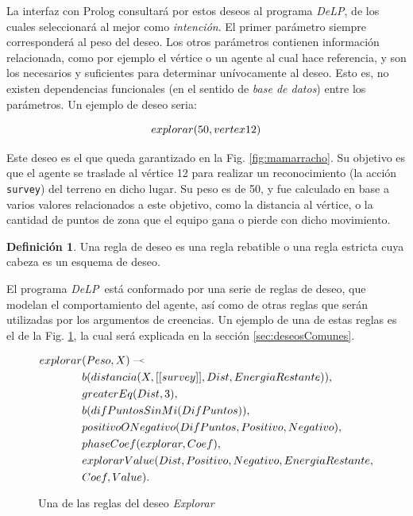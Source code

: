 \documentclass[oneside]{book}
\theoremstyle{definition}
\newtheorem{definicion}{Definición}[section]
\newcommand{\DLP}{\mbox{\textit{DeLP}}}
\newcommand{\lit}[1]{\mbox{$ #1$}}
\newcommand{\defleftarrow}{{\raise1.5pt\hbox{\tiny\defleft}}}
\newcommand{\defleft}{\mbox{---\hspace{-1.5pt}\raise.05pt\hbox{$<$}}}
\newcommand{\nlA}[1]{$$\mbox{#1}$$}
\begin{document}
La interfaz con Prolog consultará por estos deseos al programa \DLP, de los 
cuales seleccionará al mejor como \emph{intención}. El primer parámetro 
siempre corresponderá al peso del deseo. Los otros parámetros contienen 
información relacionada, como por ejemplo el vértice o un agente al cual hace 
referencia, y son los necesarios y suficientes para determinar unívocamente al
deseo. Esto es, no existen dependencias funcionales (en el sentido de 
\emph{base de datos}) entre los parámetros. Un ejemplo de deseo seria:

\nlA{\lit{explorar(50, vertex12)}}

Este deseo es el que queda garantizado en la Fig. \ref{fig:mamarracho}. Su 
objetivo es que el agente se traslade al vértice 12 para 
realizar un reconocimiento (la acción \texttt{survey}) del terreno en dicho
lugar. Su peso es de 50, y fue calculado en base a varios valores relacionados
a este objetivo, como la distancia al vértice, o la cantidad de puntos de zona
que el equipo gana o pierde con dicho movimiento.


\begin{definicion}
Una {regla de deseo} es una regla rebatible o una regla estricta cuya cabeza es un esquema 
de deseo.
\end{definicion}

El programa \DLP\ está conformado por una serie de reglas de deseo, que modelan
el comportamiento del agente, así como de otras reglas que serán utilizadas por los 
argumentos de creencias. Un ejemplo de una de estas reglas es el de la Fig. 
\ref{fig:deseoExplorar}, la cual será explicada en la sección \ref{sec:deseosComunes}.

\begin{figure}[h]
\begin{equation*}
\begin{aligned}
explorar&(Peso, X)\; \defleftarrow \;\\
	&b(distancia(X, [[survey]], Dist, EnergiaRestante)),\\
    &greaterEq(Dist, 3),\\
    &b(difPuntosSinMi(DifPuntos)),\\
    &positivoONegativo(DifPuntos, Positivo, Negativo),\\
    &phaseCoef(explorar, Coef),\\
    &explorarValue(Dist, Positivo, Negativo, EnergiaRestante, \\
    &Coef, Value).
\end{aligned}
\end{equation*}
\caption{Una de las reglas del deseo \emph{Explorar}}
\label{fig:deseoExplorar}
\end{figure}
\end{document}
